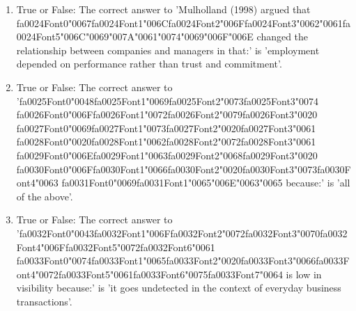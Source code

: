 \documentclass[12pt]{article}
\begin{document}
\begin{enumerate}[label=\arabic*.]
\item True or False: The correct answer to 'Mulholland (1998) argued that {\csname fa0024Font0\endcsname\char"0067}{\csname fa0024Font1\endcsname\char"006C}{\csname fa0024Font2\endcsname\char"006F}{\csname fa0024Font3\endcsname\char"0062}{\char"0061}{\csname fa0024Font5\endcsname\char"006C}{\char"0069}{\char"007A}{\char"0061}{\char"0074}{\char"0069}{\char"006F}{\char"006E} changed the relationship between companies and managers in that:' is 'employment depended on performance rather than trust and commitment'.
\item True or False: The correct answer to '{\csname fa0025Font0\endcsname\char"0048}{\csname fa0025Font1\endcsname\char"0069}{\csname fa0025Font2\endcsname\char"0073}{\csname fa0025Font3\endcsname\char"0074} {\csname fa0026Font0\endcsname\char"006F}{\csname fa0026Font1\endcsname\char"0072}{\csname fa0026Font2\endcsname\char"0079}{\csname fa0026Font3\endcsname\char"0020} {\csname fa0027Font0\endcsname\char"0069}{\csname fa0027Font1\endcsname\char"0073}{\csname fa0027Font2\endcsname\char"0020}{\csname fa0027Font3\endcsname\char"0061} {\csname fa0028Font0\endcsname\char"0020}{\csname fa0028Font1\endcsname\char"0062}{\csname fa0028Font2\endcsname\char"0072}{\csname fa0028Font3\endcsname\char"0061} {\csname fa0029Font0\endcsname\char"006E}{\csname fa0029Font1\endcsname\char"0063}{\csname fa0029Font2\endcsname\char"0068}{\csname fa0029Font3\endcsname\char"0020} {\csname fa0030Font0\endcsname\char"006F}{\csname fa0030Font1\endcsname\char"0066}{\csname fa0030Font2\endcsname\char"0020}{\csname fa0030Font3\endcsname\char"0073}{\csname fa0030Font4\endcsname\char"0063} {\csname fa0031Font0\endcsname\char"0069}{\csname fa0031Font1\endcsname\char"0065}{\char"006E}{\char"0063}{\char"0065} because:' is 'all of the above'.
\item True or False: The correct answer to '{\csname fa0032Font0\endcsname\char"0043}{\csname fa0032Font1\endcsname\char"006F}{\csname fa0032Font2\endcsname\char"0072}{\csname fa0032Font3\endcsname\char"0070}{\csname fa0032Font4\endcsname\char"006F}{\csname fa0032Font5\endcsname\char"0072}{\csname fa0032Font6\endcsname\char"0061} {\csname fa0033Font0\endcsname\char"0074}{\csname fa0033Font1\endcsname\char"0065}{\csname fa0033Font2\endcsname\char"0020}{\csname fa0033Font3\endcsname\char"0066}{\csname fa0033Font4\endcsname\char"0072}{\csname fa0033Font5\endcsname\char"0061}{\csname fa0033Font6\endcsname\char"0075}{\csname fa0033Font7\endcsname\char"0064} is low in visibility because:' is 'it goes undetected in the context of everyday business transactions'.

\end{enumerate}
\end{document}
